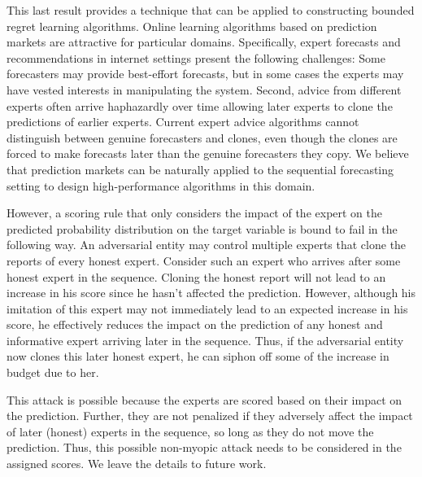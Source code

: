 \documentclass{article}
\begin{document}
This last result provides a technique that can be applied to constructing bounded regret learning algorithms. Online learning algorithms based on prediction markets are attractive for particular domains. Specifically, expert forecasts and recommendations in internet settings present the following challenges: Some forecasters may provide best-effort forecasts, but in some cases the experts may have vested interests in manipulating the system. Second, advice from different experts often arrive haphazardly over time allowing later experts to clone the predictions of earlier experts. Current expert advice algorithms cannot distinguish between genuine forecasters and clones, even though the clones are forced to make forecasts later than the genuine forecasters they copy. We believe that prediction markets can  be naturally applied to the sequential forecasting setting to design high-performance algorithms in this domain.

However, a scoring rule that only considers the impact of the expert on the predicted probability distribution on the target variable is bound to fail in the following way. An adversarial entity may control multiple experts that clone the reports of every honest expert. Consider such an expert who arrives after some honest expert in the sequence. Cloning the honest report will not lead to an increase in his score since he hasn't affected the prediction. However, although his imitation of this expert may not immediately lead to an expected increase in his score, he effectively reduces the impact on the prediction of any honest and informative expert arriving later in the sequence. Thus, if the adversarial entity now clones this later honest expert, he can siphon off some of the increase in budget due to her. 

This attack is possible because the experts are scored based on their impact on the prediction. Further, they are not penalized if they adversely affect the impact of later (honest) experts in the sequence, so long as they do not move the prediction. Thus, this possible non-myopic attack needs to be considered in the assigned scores. We leave the details to future work.



\end{document}

